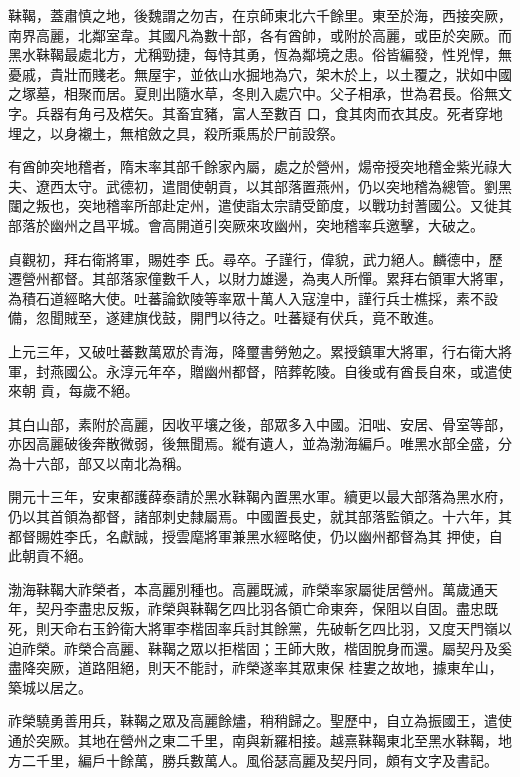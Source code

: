 \begin{pinyinscope}
 靺鞨，蓋肅慎之地，後魏謂之勿吉，在京師東北六千餘里。東至於海，西接突厥，南界高麗，北鄰室韋。其國凡為數十部，各有酋帥，或附於高麗，或臣於突厥。而黑水靺鞨最處北方，尤稱勁捷，每恃其勇，恆為鄰境之患。俗皆編發，性兇悍，無憂戚，貴壯而賤老。無屋宇，並依山水掘地為穴，架木於上，以土覆之，狀如中國之塚墓，相聚而居。夏則出隨水草，冬則入處穴中。父子相承，世為君長。俗無文字。兵器有角弓及楛矢。其畜宜豬，富人至數百
 口，食其肉而衣其皮。死者穿地埋之，以身襯土，無棺斂之具，殺所乘馬於尸前設祭。



 有酋帥突地稽者，隋末率其部千餘家內屬，處之於營州，煬帝授突地稽金紫光祿大夫、遼西太守。武德初，遣間使朝貢，以其部落置燕州，仍以突地稽為總管。劉黑闥之叛也，突地稽率所部赴定州，遣使詣太宗請受節度，以戰功封蓍國公。又徙其部落於幽州之昌平城。會高開道引突厥來攻幽州，突地稽率兵邀擊，大破之。



 貞觀初，拜右衛將軍，賜姓李
 氏。尋卒。子謹行，偉貌，武力絕人。麟德中，歷遷營州都督。其部落家僮數千人，以財力雄邊，為夷人所憚。累拜右領軍大將軍，為積石道經略大使。吐蕃論欽陵等率眾十萬人入寇湟中，謹行兵士樵採，素不設備，忽聞賊至，遂建旗伐鼓，開門以待之。吐蕃疑有伏兵，竟不敢進。



 上元三年，又破吐蕃數萬眾於青海，降璽書勞勉之。累授鎮軍大將軍，行右衛大將軍，封燕國公。永淳元年卒，贈幽州都督，陪葬乾陵。自後或有酋長自來，或遣使來朝
 貢，每歲不絕。



 其白山部，素附於高麗，因收平壤之後，部眾多入中國。汨咄、安居、骨室等部，亦因高麗破後奔散微弱，後無聞焉。縱有遺人，並為渤海編戶。唯黑水部全盛，分為十六部，部又以南北為稱。



 開元十三年，安東都護薛泰請於黑水靺鞨內置黑水軍。續更以最大部落為黑水府，仍以其首領為都督，諸部刺史隸屬焉。中國置長史，就其部落監領之。十六年，其都督賜姓李氏，名獻誠，授雲麾將軍兼黑水經略使，仍以幽州都督為其
 押使，自此朝貢不絕。



 渤海靺鞨大祚榮者，本高麗別種也。高麗既滅，祚榮率家屬徙居營州。萬歲通天年，契丹李盡忠反叛，祚榮與靺鞨乞四比羽各領亡命東奔，保阻以自固。盡忠既死，則天命右玉鈐衛大將軍李楷固率兵討其餘黨，先破斬乞四比羽，又度天門嶺以迫祚榮。祚榮合高麗、靺鞨之眾以拒楷固；王師大敗，楷固脫身而還。屬契丹及奚盡降突厥，道路阻絕，則天不能討，祚榮遂率其眾東保
 桂婁之故地，據東牟山，築城以居之。



 祚榮驍勇善用兵，靺鞨之眾及高麗餘燼，稍稍歸之。聖歷中，自立為振國王，遣使通於突厥。其地在營州之東二千里，南與新羅相接。越熹靺鞨東北至黑水靺鞨，地方二千里，編戶十餘萬，勝兵數萬人。風俗瑟高麗及契丹同，頗有文字及書記。




\end{pinyinscope}

